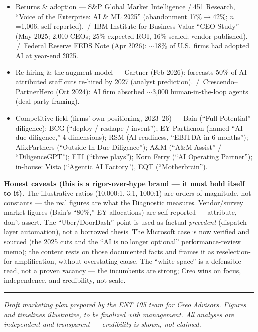 \documentclass[11pt]{article}
\begin{document}
\begin{itemize}
  \item Returns \& adoption --- S\&P Global Market Intelligence / 451 Research, ``Voice of the Enterprise: AI \& ML 2025'' (abandonment 17\%$\to$42\%; $n$=1{,}006; self-reported). \,/\, IBM Institute for Business Value ``CEO Study'' (May 2025; 2{,}000 CEOs; 25\% expected ROI, 16\% scaled; vendor-published). \,/\, Federal Reserve FEDS Note (Apr 2026): $\sim$18\% of U.S.\ firms had adopted AI at year-end 2025.
  \item Re-hiring \& the augment model --- Gartner (Feb 2026): forecasts 50\% of AI-attributed staff cuts re-hired by 2027 (analyst prediction). \,/\, Crescendo--PartnerHero (Oct 2024): AI firm absorbed $\sim$3{,}000 human-in-the-loop agents (deal-party framing).
  \item Competitive field (firms' own positioning, 2023--26) --- Bain (``Full-Potential'' diligence); BCG (``deploy / reshape / invent''); EY-Parthenon (named ``AI due diligence,'' 4 dimensions); RSM (AI-readiness, ``EBITDA in 6 months''); AlixPartners (``Outside-In Due Diligence''); A\&M (``A\&M Assist'' / ``DiligenceGPT''); FTI (``three plays''); Korn Ferry (``AI Operating Partner''); in-house: Vista (``Agentic AI Factory''), EQT (``Motherbrain'').
\end{itemize}

\begin{caution}
\textbf{Honest caveats (this is a rigor-over-hype brand --- it must hold itself to it).}
The illustrative ratios (10{,}000:1, 3:1, 1000:1) are orders-of-magnitude, not constants ---
the real figures are what the Diagnostic measures. Vendor/survey market figures (Bain's
``80\%,'' EY allocations) are self-reported --- attribute, don't assert. The ``Uber/DoorDash''
point is used as factual \emph{precedent} (dispatch-layer automation), not a borrowed thesis.
The Microsoft case is now verified and sourced (the 2025 cuts and the ``AI is no longer
optional'' performance-review memo); the content rests on those documented facts and frames it as
reselection-for-amplification, without overstating cause. The ``white space'' is a defensible
read, not a proven vacancy --- the
incumbents are strong; Creo wins on focus, independence, and credibility, not scale.
\end{caution}

\vspace{4pt}\hrule\vspace{4pt}
{\footnotesize\itshape Draft marketing plan prepared by the ENT 105 team for Creo Advisors.
Figures and timelines illustrative, to be finalized with management. All analyses are
independent and transparent --- credibility is shown, not claimed.}
\end{document}
